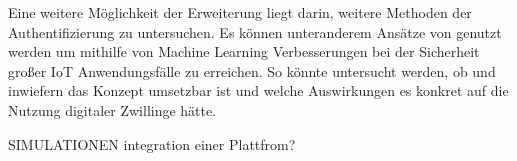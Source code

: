 \documentclass[
	12pt,
	BCOR=5mm,
	DIV=12,
	headinclude=on,
	footinclude=off,
	parskip=half,
	bibliography=totoc,
	listof=entryprefix,
	toc=listof,
	numbers=noenddot,
	plainfootsepline
]{scrreprt}
\begin{document}
Eine weitere Möglichkeit der Erweiterung liegt darin, weitere Methoden der Authentifizierung zu untersuchen. Es können unteranderem Ansätze von \citeauthor{fang2020fast} genutzt werden um mithilfe von Machine Learning Verbesserungen bei der Sicherheit großer IoT Anwendungsfälle zu erreichen. \autocite{fang2020fast} So könnte untersucht werden, ob und inwiefern das Konzept umsetzbar ist und welche Auswirkungen es konkret auf die Nutzung digitaler Zwillinge hätte. 

SIMULATIONEN integration einer Plattfrom?

\clearpage
\ihead{}
\printbibliography[title=Literaturverzeichnis]
\cleardoublepage

\end{document}
